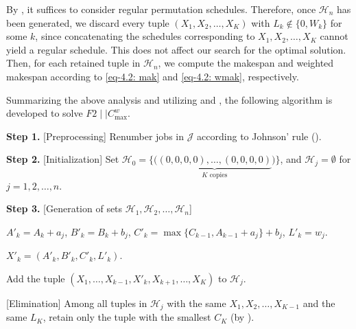 \documentclass[12pt]{article}
\begin{document}
\begin{sloppypar}
        By , it suffices to consider regular permutation schedules. Therefore, once $\mathcal{H}_n$ has been generated, we discard every tuple $(X_1, X_2, \ldots, X_K)$ with $L_k \notin \{0, W_k\}$ for some $k$, since concatenating the schedules corresponding to $X_1, X_2, \ldots, X_K$ cannot yield a regular schedule. This does not affect our search for the optimal solution. Then, for each retained tuple in $\mathcal{H}_n$, we compute the makespan and weighted makespan according to \cref{eq-4.2: mak} and \cref{eq-4.2: wmak}, respectively.
        
        Summarizing the above analysis and utilizing  and , the following algorithm is developed to solve $F2 \mid \mid C_{\max}^w$.        
        
        \begin{algorithm}[H]
            \small
            \linespread{1.2}\selectfont
            \SetAlgoLined 
            \DontPrintSemicolon
            \caption{An exact DP algorithm for $F2 \mid \mid C_{\max}^w$} \label{alg:dp} 
            \BlankLine
            \textbf{Step 1.} [Preprocessing] Renumber jobs in $\mathcal{J}$ according to Johnson' rule (). \;
            
            \textbf{Step 2.} [Initialization] Set $\mathcal{H}_0=\{\Big(\underbrace{(0,0,0,0),\ldots,(0,0,0,0)}_{K\text{ copies}}\Big)\}$, and $\mathcal{H}_j=\emptyset$ for $j=1, 2, \ldots, n$. \;
            
            \textbf{Step 3.} [Generation of sets $\mathcal{H}_1, \mathcal{H}_2, \ldots, \mathcal{H}_n$] 
            
            {
                {
                    {
                        $A'_k = A_k+a_j$, $B'_k = B_k+b_j$, $C'_k = \max\{C_{k-1}, A_{k-1}+a_j\}+b_j$, $L'_k= w_j$. \;
                        
                        $X'_k=(A'_k, B'_k, C'_k, L'_k)$. \;    
                        
                        Add the tuple $(X_1, \ldots, X_{k-1}, X'_k, X_{k+1}, \ldots, X_K)$ to $\mathcal{H}_j$. \;
                    }
                }
                [Elimination] Among all tuples in $\mathcal{H}_j$ with the same $X_1, X_2, \ldots, X_{K-1}$ and the same $L_K$, retain only the tuple with the smallest $C_K$ (by ). \;
            }
            

\end{algorithm}
\end{sloppypar}
\end{document}
